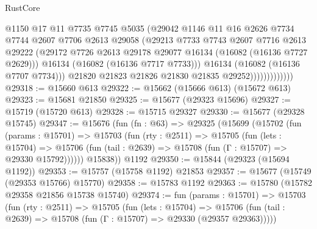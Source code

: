 \begin{lexlean}{RustCore}
\begin{coremodule}
                              @1150
                              @17
                              @11
                              @7735
                              @7745
                              @5035
                              (@29042
                                @1146
                                @11
                                @16
                                @2626
                                @7734
                                @7744
                                @2607
                                @7706
                                @2613
                                @29058
                                (@29213
                                  @7733
                                  @7743
                                  @2607
                                  @7716
                                  @2613
                                  @29222
                                  (@29172
                                    @7726
                                    @2613
                                    @29178
                                    @29077
                                    @16134
                                    (@16082 (@16136 @7727 @2629)))
                                  @16134
                                  (@16082 (@16136 @7717 @7733)))
                                @16134
                                (@16082 (@16136 @7707 @7734)))
                              @21820
                              @21823
                              @21826
                              @21830
                              @21835
                              @29252)))))))))))))
@29318 := @15660 @613
@29322 := @15662 (@15666 @613) (@15672 @613)
@29323 := @15681 @21850
@29325 := @15677 (@29323 @15696)
@29327 := @15719 (@15720 @613)
@29328 := @15715 @29327
@29330 := @15677 (@29328 @15745)
@29347 := @15676
    (fun (fn : @63) =>
    @29325
      (@15699
        (@15702
          (fun (params : @15701) =>
          @15703
            (fun (rty : @2511) =>
            @15705
              (fun (lets : @15704) =>
              @15706 (fun (tail : @2639) => @15708 (fun (Γ : @15707) => @29330 @15792))))))
        @15838))
    @1192
@29350 := @15844 (@29323 (@15694 @1192))
@29353 := @15757 (@15758 @1192) @21853
@29357 := @15677 (@15749 (@29353 @15766) @15770)
@29358 := @15783 @1192
@29363 := @15780 (@15782 @29358 @21856 @15738 @15740)
@29374 := fun (params : @15701) =>
  @15703
    (fun (rty : @2511) =>
    @15705
      (fun (lets : @15704) =>
      @15706 (fun (tail : @2639) => @15708 (fun (Γ : @15707) => @29330 (@29357 @29363)))))

\end{coremodule}
\end{lexlean}
